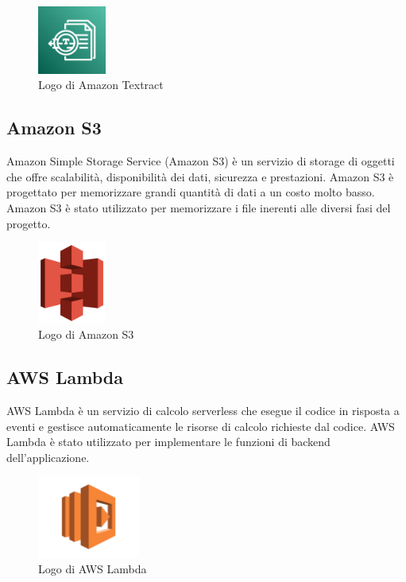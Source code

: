 \begin{figure}[h]
  \centering
  \includegraphics[width=0.2\textwidth]{img/tecnologie/textract.png}
  \caption{Logo di Amazon Textract}
  \label{fig:textract}
\end{figure}

\subsection{Amazon S3}
Amazon Simple Storage Service (Amazon S3) è un servizio di storage di oggetti che offre scalabilità, disponibilità dei dati, sicurezza e prestazioni. Amazon S3 è progettato per memorizzare grandi quantità di dati a un costo molto basso. Amazon S3 è stato utilizzato per memorizzare i file inerenti alle diversi fasi del progetto.

\begin{figure}[h]
  \centering
  \includegraphics[width=0.2\textwidth]{img/tecnologie/s3.png}
  \caption{Logo di Amazon S3}
  \label{fig:s3}
\end{figure}

\subsection{AWS Lambda}
AWS Lambda è un servizio di calcolo serverless che esegue il codice in risposta a eventi e gestisce automaticamente le risorse di calcolo richieste dal codice. AWS Lambda è stato utilizzato per implementare le funzioni di backend dell'applicazione. 

\begin{figure}[h]
  \centering
  \includegraphics[width=0.3\textwidth]{img/tecnologie/AWS_Lambda.png}
  \caption{Logo di AWS Lambda}
  \label{fig:lambda}
\end{figure}

